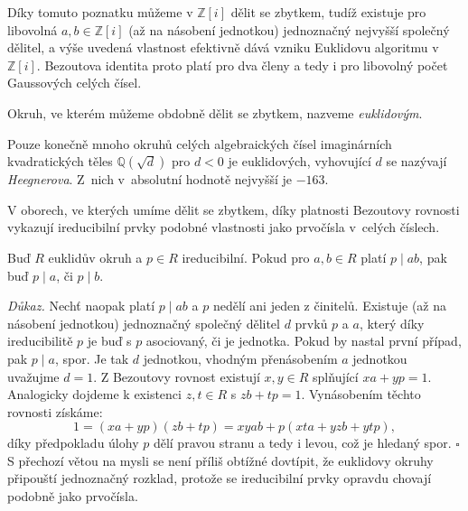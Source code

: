 \documentclass[12pt]{report}
\begin{document}
Díky tomuto poznatku můžeme v $\mathbb{Z}[i]$ dělit se zbytkem, tudíž existuje pro libovolná $a,b  \in \mathbb{Z}[i]$ (až na násobení jednotkou) jednoznačný nejvyšší společný dělitel, a výše uvedená vlastnost efektivně dává vzniku Euklidovu algoritmu v $\mathbb{Z}[i]$. Bezoutova identita proto platí pro dva členy a tedy i pro libovolný počet Gaussových celých čísel.
\begin{definice}
Okruh, ve kterém můžeme obdobně dělit se zbytkem, nazveme \textit{euklidovým}.
\end{definice}

\begin{poznamka}
Pouze konečně mnoho okruhů celých algebraických čísel imaginárních kvadratických těles $\mathbb{Q}(\sqrt{d})$ pro $d<0$ je euklidových, vyhovující $d$ se nazývají \textit{Heegnerova}. Z~nich v~absolutní hodnotě nejvyšší je $-163$.
\end{poznamka}


V oborech, ve kterých umíme dělit se zbytkem, díky platnosti Bezoutovy rovnosti vykazují ireducibilní prvky podobné vlastnosti jako prvočísla v~celých číslech.

\begin{veta}
Buď $R$ euklidův okruh a $p \in R$ ireducibilní. Pokud pro $a,b \in R$ platí $p \mid ab$, pak buď $p \mid a$, či $p \mid b$.
\end{veta}
\noindent \textit{Důkaz.} Nechť naopak platí $p \mid ab$ a $p$ nedělí ani jeden z činitelů. Existuje (až na násobení jednotkou) jednoznačný společný dělitel $d$ prvků $p$ a $a$, který díky ireducibilitě $p$ je buď s $p$ asociovaný, či je jednotka. Pokud by nastal první případ, pak $p \mid a$, spor. Je tak $d$ jednotkou, vhodným přenásobením $a$ jednotkou uvažujme $d = 1$. Z Bezoutovy rovnost existují $x,y \in R$ splňující $xa+yp = 1$. Analogicky dojdeme k existenci $z,t \in R$ s $zb+tp = 1$. Vynásobením těchto rovnosti získáme:
\begin{equation*}
1 = (xa+yp)(zb+tp) = xyab + p(xta+yzb+ytp),
\end{equation*}
díky předpokladu úlohy $p$ dělí pravou stranu a tedy i levou, což je hledaný spor. \hfill $\square$\\

S přechozí větou na mysli se není příliš obtížné dovtípit, že euklidovy okruhy připouští jednoznačný rozklad, protože se ireducibilní prvky opravdu chovají podobně jako prvočísla.
\end{document}

